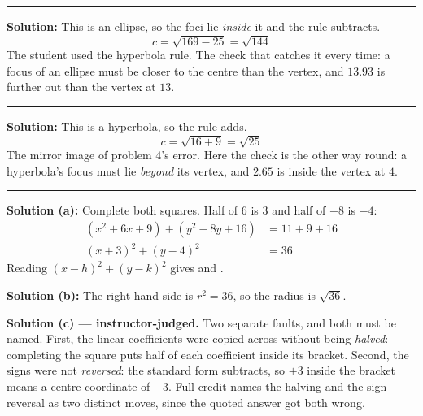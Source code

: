 \documentclass[12pt]{article}
\begin{document}
\vspace{0.2cm}\noindent\rule{\linewidth}{0.2pt}


\textbf{Solution:} This is an ellipse, so the foci lie \emph{inside} it and the rule
subtracts.
\[ c = \sqrt{169 - 25} = \sqrt{144} \]
The student used the hyperbola rule. The check that catches it every time: a focus of an
ellipse must be closer to the centre than the vertex, and $13.93$ is further out than the
vertex at $13$.

\vspace{0.2cm}\noindent\rule{\linewidth}{0.2pt}


\textbf{Solution:} This is a hyperbola, so the rule adds.
\[ c = \sqrt{16 + 9} = \sqrt{25} \]
The mirror image of problem $4$'s error. Here the check is the other way round: a hyperbola's
focus must lie \emph{beyond} its vertex, and $2.65$ is inside the vertex at $4$.

\vspace{0.2cm}\noindent\rule{\linewidth}{0.2pt}


\textbf{Solution (a):} Complete both squares. Half of $6$ is $3$ and half of $-8$ is $-4$:
\begin{align*}
  (x^2 + 6x + 9) + (y^2 - 8y + 16) &= 11 + 9 + 16 \\
  (x + 3)^2 + (y - 4)^2 &= 36
\end{align*}
Reading $(x-h)^2 + (y-k)^2$ gives  and .

\textbf{Solution (b):} The right-hand side is $r^2 = 36$, so the radius is $\sqrt{36}$.

\vspace{0.15cm}
\textbf{Solution (c) --- instructor-judged.} Two separate faults, and both must be named.
First, the linear coefficients were copied across without being \emph{halved}: completing the
square puts half of each coefficient inside its bracket. Second, the signs were not
\emph{reversed}: the standard form subtracts, so $+3$ inside the bracket means a centre
coordinate of $-3$. Full credit names the halving and the sign reversal as two distinct
moves, since the quoted answer got both wrong.
\end{document}
